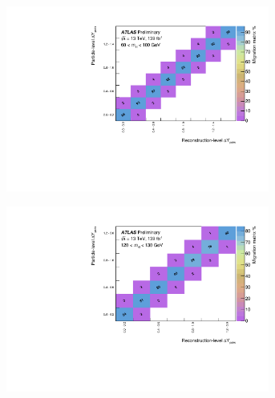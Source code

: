 
\begin{figure}[htb]
  \centering
  \begin{subfigure}{.49\textwidth}\centering\includegraphics[width = 0.95\textwidth]{Figures/m4l/UnfoldingStudies/v014_matrices/deltaYPairs_m4l60-100Matrix.pdf}\end{subfigure}
  \begin{subfigure}{.49\textwidth}\centering\includegraphics[width = 0.95\textwidth]{Figures/m4l/UnfoldingStudies/v014_matrices/deltaYPairs_m4l120-130Matrix.pdf}\end{subfigure}

\end{figure}
